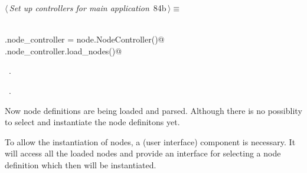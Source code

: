 \documentclass[
    a4paper,      %
    10pt,         %
    openright,    %
    notitlepage,  %
    parskip=half, %
]{scrreprt}       %
\theoremstyle{definition}                    %
\begin{document}
\begin{flushleft} \small
\begin{minipage}{\linewidth}\label{scrap135}\raggedright\small
{} $\langle\,${\itshape Set up controllers for main application}\nobreak\ {\footnotesize {84b}}$\,\rangle\equiv$
\vspace{-1exm}
\begin{list}{}{} \item
\mbox{}\lstinline@@\\
\mbox{}\lstinline@self.node_controller = node.NodeController()@\\
\mbox{}\lstinline@self.node_controller.load_nodes()@{\NWsep}
\end{list}
\vspace{-1.5ex}
\footnotesize
\begin{list}{}{\setlength{\itemsep}{-\parsep}\setlength{\itemindent}{-\leftmargin}}
\item \NWtxtMacroDefBy\ .
\item \NWtxtMacroRefIn\ .

\item{}
\end{list}
\end{minipage}\vspace{4ex}
\end{flushleft}
Now node definitions are being loaded and parsed. Although there is no
possiblity to select and instantiate the node definitons yet.

To allow the instantiation of nodes, a (user interface) component is necessary.
It will access all the loaded nodes and provide an interface for selecting a
node definition which then will be instantiated.
\end{document}
